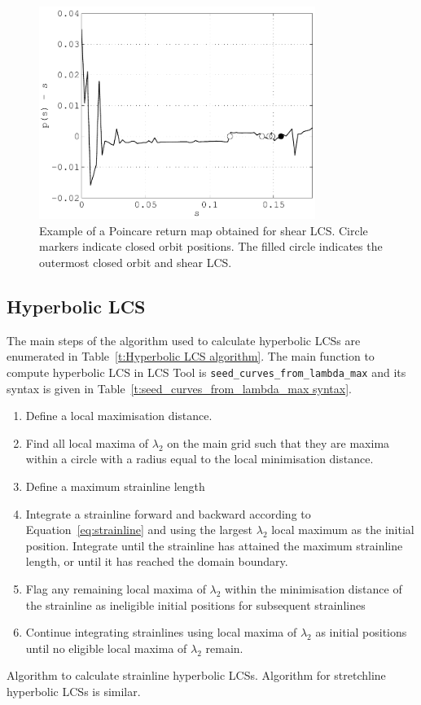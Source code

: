 \documentclass{article}
\begin{document}
\begin{figure}
\begin{center}
\includegraphics[width=0.8\textwidth]{graphics/double_gyre/poincare_return_map}
\end{center}
\caption{Example of a Poincare return map obtained for shear LCS. Circle markers indicate closed orbit positions. The filled circle indicates the outermost closed orbit and shear LCS.}
\label{f:Poincare return map}
\end{figure}

\subsection{Hyperbolic LCS}

The main steps of the algorithm used to calculate hyperbolic LCSs are enumerated in Table~\ref{t:Hyperbolic LCS algorithm}. The main function to compute hyperbolic LCS in LCS Tool is \lstinline!seed_curves_from_lambda_max! and its syntax is given in Table~\ref{t:seed_curves_from_lambda_max syntax}.

\begin{table}
\begin{enumerate}
\item Define a local maximisation distance.
\item Find all local maxima of $\lambda_2$ on the main grid such that they are maxima within a circle with a radius equal to the local minimisation distance.
\item Define a maximum strainline length
\item Integrate a strainline forward and backward according to Equation~\eqref{eq:strainline} and using the largest $\lambda_2$ local maximum as the initial position. Integrate until the strainline has attained the maximum strainline length, or until it has reached the domain boundary.
\item Flag any remaining local maxima of $\lambda_2$ within the minimisation distance of the strainline as ineligible initial positions for subsequent strainlines
\item Continue integrating strainlines using local maxima of $\lambda_2$ as initial positions until no eligible local maxima of $\lambda_2$ remain.
\end{enumerate}
\caption{Algorithm to calculate strainline hyperbolic LCSs. Algorithm for stretchline hyperbolic LCSs is similar.}
\label{t:Hyperbolic LCS algorithm}
\end{table}
\end{document}
